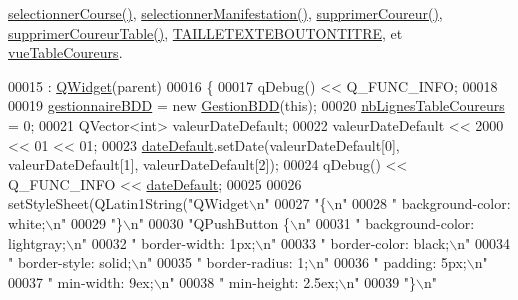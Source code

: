 \hyperlink{class_i_h_m_gestion_cross_ae555b32462455a2cdaf0f8dc2e016d14}{selectionner\+Course()}, \hyperlink{class_i_h_m_gestion_cross_a60fc58610d01534b3df66ac7dd76b4dc}{selectionner\+Manifestation()}, \hyperlink{class_i_h_m_gestion_cross_a4fd00fda0e47366d66d046e344a1617e}{supprimer\+Coureur()}, \hyperlink{class_i_h_m_gestion_cross_af13fabb9831fcd237c9c1e7ee75c47b8}{supprimer\+Coureur\+Table()}, \hyperlink{ihmgestioncross_8h_a562719681712f3dd8e5b5a158597e78b}{T\+A\+I\+L\+L\+E\+T\+E\+X\+T\+E\+B\+O\+U\+T\+O\+N\+T\+I\+T\+RE}, et \hyperlink{class_i_h_m_gestion_cross_a4a0ba98c5b671a38d67942254d2329db}{vue\+Table\+Coureurs}.


\begin{DoxyCode}
00015                                                 : \hyperlink{class_q_widget}{QWidget}(parent)
00016 \{
00017     qDebug() << Q\_FUNC\_INFO;
00018 
00019     \hyperlink{class_i_h_m_gestion_cross_a440bac63a3e51db3e2c08e883f8cafc9}{gestionnaireBDD} = \textcolor{keyword}{new} \hyperlink{class_gestion_b_d_d}{GestionBDD}(\textcolor{keyword}{this});
00020     \hyperlink{class_i_h_m_gestion_cross_a0f4f5886077b1c5cbfa9cc0680d0380f}{nbLignesTableCoureurs} = 0;
00021     QVector<int> valeurDateDefault;
00022     valeurDateDefault << 2000 << 01 << 01;
00023     \hyperlink{class_i_h_m_gestion_cross_a021706ef369d2bf3b95bcb4a8ecfdbe4}{dateDefault}.setDate(valeurDateDefault[0], valeurDateDefault[1], valeurDateDefault[2]);
00024     qDebug() << Q\_FUNC\_INFO << \hyperlink{class_i_h_m_gestion_cross_a021706ef369d2bf3b95bcb4a8ecfdbe4}{dateDefault};
00025 
00026     setStyleSheet(QLatin1String(\textcolor{stringliteral}{"QWidget\(\backslash\)n"}
00027     \textcolor{stringliteral}{"\{\(\backslash\)n"}
00028     \textcolor{stringliteral}{"   background-color: white;\(\backslash\)n"}
00029     \textcolor{stringliteral}{"\}\(\backslash\)n"}
00030     \textcolor{stringliteral}{"QPushButton \{\(\backslash\)n"}
00031     \textcolor{stringliteral}{"    background-color: lightgray;\(\backslash\)n"}
00032     \textcolor{stringliteral}{"    border-width: 1px;\(\backslash\)n"}
00033     \textcolor{stringliteral}{"    border-color: black;\(\backslash\)n"}
00034     \textcolor{stringliteral}{"    border-style: solid;\(\backslash\)n"}
00035     \textcolor{stringliteral}{"    border-radius: 1;\(\backslash\)n"}
00036     \textcolor{stringliteral}{"    padding: 5px;\(\backslash\)n"}
00037     \textcolor{stringliteral}{"    min-width: 9ex;\(\backslash\)n"}
00038     \textcolor{stringliteral}{"    min-height: 2.5ex;\(\backslash\)n"}
00039     \textcolor{stringliteral}{"\}\(\backslash\)n"}

\end{DoxyCode}
